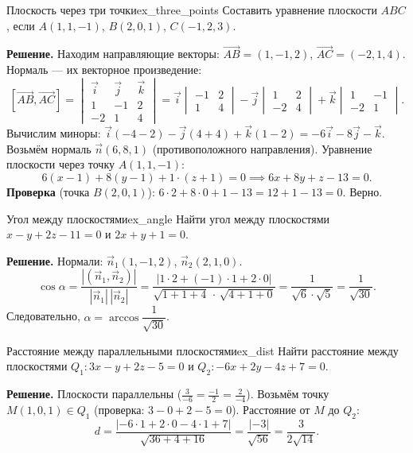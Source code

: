 \documentclass[12pt,a4paper]{article}
\begin{document}
\begin{definition}{Плоскость через три точки}{ex_three_points}
  Составить уравнение плоскости $ABC$, если $A(1,1,-1)$, $B(2,0,1)$,
  $C(-1,2,3)$.

  \textbf{Решение.} Находим направляющие векторы:
  $\overrightarrow{AB} = (1,-1,2)$, $\overrightarrow{AC} = (-2,1,4)$.
  Нормаль --- их векторное произведение:
  \[
    [\overrightarrow{AB}, \overrightarrow{AC}] =
    \begin{vmatrix}
      \vec{i} & \vec{j} & \vec{k} \\ 1 & -1 & 2 \\ -2 & 1 & 4
    \end{vmatrix}
    = \vec{i}
    \begin{vmatrix} -1 & 2 \\ 1 & 4
    \end{vmatrix}
    - \vec{j}
    \begin{vmatrix} 1 & 2 \\ -2 & 4
    \end{vmatrix}
    + \vec{k}
    \begin{vmatrix} 1 & -1 \\ -2 & 1
    \end{vmatrix}.
  \]
  Вычислим миноры:
  $\vec{i}(-4 - 2) - \vec{j}(4 + 4) + \vec{k}(1 - 2)
  = -6\vec{i} - 8\vec{j} - \vec{k}$.
  Возьмём нормаль $\vec{n}(6, 8, 1)$ (противоположного направления).
  Уравнение плоскости через точку $A(1,1,-1)$:
  \[
    6(x-1) + 8(y-1) + 1\cdot(z+1) = 0 \implies
    6x + 8y + z - 13 = 0.
  \]
  \textbf{Проверка} (точка $B(2,0,1)$):
  $6\cdot 2 + 8\cdot 0 + 1 - 13 = 12 + 1 - 13 = 0$. Верно.
\end{definition}

\begin{definition}{Угол между плоскостями}{ex_angle}
  Найти угол между плоскостями $x - y + 2z - 11 = 0$ и
  $2x + y + 1 = 0$.

  \textbf{Решение.} Нормали: $\vec{n}_1(1,-1,2)$, $\vec{n}_2(2,1,0)$.
  \[
    \cos\alpha = \frac{|(\vec{n}_1, \vec{n}_2)|}{|\vec{n}_1|\,|\vec{n}_2|}
    = \frac{|1\cdot 2 + (-1)\cdot 1 + 2\cdot 0|}
    {\sqrt{1+1+4}\,\cdot\,\sqrt{4+1+0}}
    = \frac{1}{\sqrt{6}\cdot\sqrt{5}} = \frac{1}{\sqrt{30}}.
  \]
  Следовательно, $\alpha = \arccos\dfrac{1}{\sqrt{30}}$.
\end{definition}

\begin{definition}{Расстояние между параллельными плоскостями}{ex_dist}
  Найти расстояние между плоскостями $Q_1\colon 3x - y + 2z - 5 = 0$ и
  $Q_2\colon -6x + 2y - 4z + 7 = 0$.

  \textbf{Решение.} Плоскости параллельны
  ($\tfrac{3}{-6} = \tfrac{-1}{2} = \tfrac{2}{-4}$). Возьмём точку
  $M(1,0,1) \in Q_1$ (проверка: $3 - 0 + 2 - 5 = 0$). Расстояние от
  $M$ до $Q_2$:
  \[
    d = \frac{|-6\cdot 1 + 2\cdot 0 - 4\cdot 1 + 7|}{\sqrt{36+4+16}}
    = \frac{|-3|}{\sqrt{56}} = \frac{3}{2\sqrt{14}}.
  \]
\end{definition}
\end{document}
